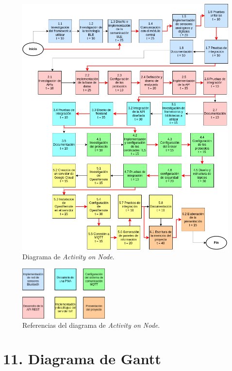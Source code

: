 \documentclass[
11pt, %
]{charter}
\begin{document}
\begin{figure}[htpb]
\centering 
\includegraphics[width=1\textwidth]{./Figuras/diagrama_aon.png}
\caption{Diagrama de \textit{Activity on Node}.}
\label{fig:AoN}
\end{figure}

\begin{figure}[htpb]
\centering 
\includegraphics[width=0.4\textwidth]{./Figuras/referencias_aon.png}
\caption{Referencias del diagrama de \textit{Activity on Node}.}
\label{fig:AoN}
\end{figure}



\section{11. Diagrama de Gantt}
\label{sec:gantt}
\end{document}
